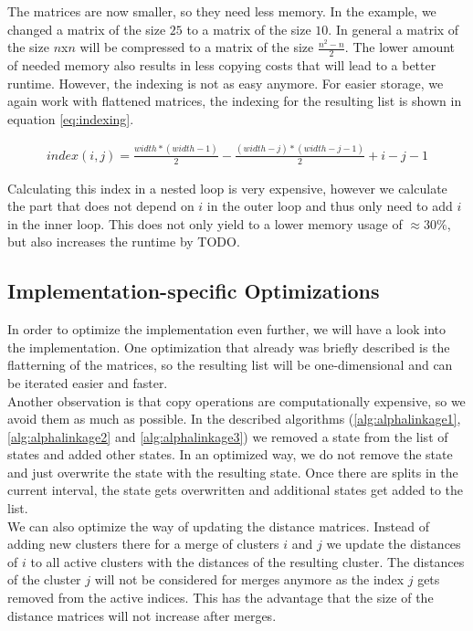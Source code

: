 The matrices are now smaller, so they need less memory. In the example, we changed a matrix of the size $25$ to a matrix of the size $10$. In general a matrix of the size $n$x$n$ will be compressed to a matrix of the size $\frac{n^2-n}{2}$. The lower amount of needed memory also results in less copying costs that will lead to a better runtime. However, the indexing is not as easy anymore. For easier storage, we again work with flattened matrices, the indexing for the resulting list is shown in equation \ref{eq:indexing}.

\begin{equation}
    \begin{aligned}
        index(i,j) = \frac{width * (width - 1)}{2} - \frac{(width - j) * (width - j - 1)}{2} + i - j - 1
    \end{aligned}
    \label{eq:indexing}
\end{equation}

Calculating this index in a nested loop is very expensive, however we calculate the part that does not depend on $i$ in the outer loop and thus only need to add $i$ in the inner loop. This does not only yield to a lower memory usage of $\approx 30\%$, but also increases the runtime by TODO.


\subsection{Implementation-specific Optimizations}

In order to optimize the implementation even further, we will have a look into the implementation. One optimization that already was briefly described is the flatterning of the matrices, so the resulting list will be one-dimensional and can be iterated easier and faster.\\

Another observation is that copy operations are computationally expensive, so we avoid them as much as possible. In the described algorithms (\ref{alg:alphalinkage1}, \ref{alg:alphalinkage2} and \ref{alg:alphalinkage3}) we removed a state from the list of states and added other states. In an optimized way, we do not remove the state and just overwrite the state with the resulting state. Once there are splits in the current interval, the state gets overwritten and additional states get added to the list.\\

We can also optimize the way of updating the distance matrices. Instead of adding new clusters there for a merge of clusters $i$ and $j$ we update the distances of $i$ to all active clusters with the distances of the resulting cluster. The distances of the cluster $j$ will not be considered for merges anymore as the index $j$ gets removed from the active indices. This has the advantage that the size of the distance matrices will not increase after merges.\\

